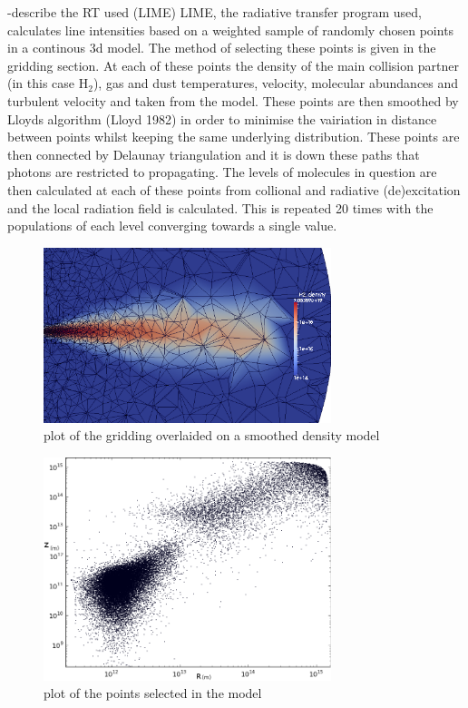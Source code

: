 \documentclass[useAMS,usenatbib]{mn2e}
\begin{document}
-describe the RT used (LIME) 
LIME, the radiative transfer program used, calculates line intensities based on a weighted sample of randomly chosen points in a continous 3d model. The method of selecting these points is given in the gridding section. At each of these points the density of the main collision partner (in this case H$_2$), gas and dust temperatures, velocity, molecular abundances and turbulent velocity and taken from the model. These points are then smoothed by Lloyds algorithm (Lloyd 1982) in order to minimise the vairiation in distance between points whilst keeping the same underlying distribution. These points are then connected by Delaunay triangulation and it is down these paths that photons are restricted to propagating. The levels of molecules in question are then  calculated at each of these points from collional and radiative (de)excitation and the local radiation field is calculated. This is repeated 20 times with the populations of each level converging towards a single value. \newline


\begin{figure}
 \includegraphics[width=84mm]{Figures/model/Lime_grid3.png}

 \caption{plot of the gridding overlaided on a smoothed density model}
\end{figure}

\begin{figure}
 \includegraphics[width=84mm]{Figures/model/lime_points_rz2.png}

 \caption{plot of the points selected in the model}
\end{figure}
\end{document}
